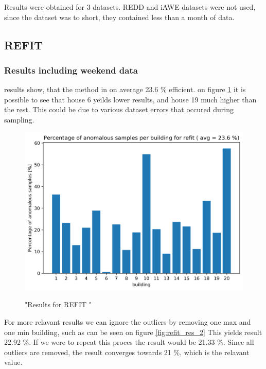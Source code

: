 Results were obtained for 3 datasets. 
REDD and iAWE datasets were not used, since the dataset was to short, they contained less than a month of data. 


\subsection{REFIT}

\subsubsection{Results including weekend data}
results show, that the method in on average 23.6 \% efficient. 
on figure \ref{fig:refit_res} it is possible to see that house 6 yeilds lower results, and house 19 much higher than the rest. 
This could be due to various dataset errors that occured during sampling.

\begin{figure}[H]
	\centering
	\caption{"Results for REFIT "}
	\includegraphics[width=1\textwidth]{Figures/EC/refit_res.png}
	\label{fig:refit_res}
\end{figure}

For more relavant results we can ignore the outliers by removing one max and one min building, such as can be seen on figure \ref{fig:refit_res_2}
This yields result 22.92 \%.
If we were to repeat this proces the result would be 21.33 \%.
Since all outliers are removed, the result converges towards 21 \%, which is the relavant value. 


